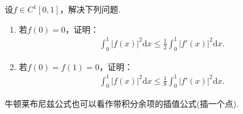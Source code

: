 \documentclass[../../main.tex]{subfiles}%
\begin{document}
\begin{example}
设\(f \in C^1[0, 1]\)，解决下列问题.
\begin{enumerate}
\item 若\(f(0) = 0\)，证明：
\begin{align*}
\int_{0}^{1}|f(x)|^{2}\mathrm{d}x \leqslant \frac{1}{2}\int_{0}^{1}|f'(x)|^{2}\mathrm{d}x.
\end{align*}

\item 若\(f(0) = f(1) = 0\)，证明：
\begin{align*}
\int_{0}^{1}|f(x)|^{2}\mathrm{d}x \leqslant \frac{1}{8}\int_{0}^{1}|f'(x)|^{2}\mathrm{d}x.
\end{align*}
\end{enumerate}
\end{example}
\begin{remark}
牛顿莱布尼兹公式也可以看作带积分余项的插值公式(插一个点).
\end{remark}
\end{document}
